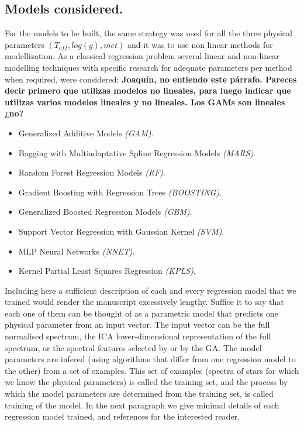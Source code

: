\subsection{Models considered.}
\label {ssub:models}
For the models to be built, the same strategy was used for all the
three physical parameters $(T_{eff}, log(g), met)$ and it was to use
non linear methods for modellization.  As a classical regression
problem several linear and non-linear modelling techniques with
specific research for adequate parameters per method when required,
were considered: {\bf Joaquín, no entiendo este párrafo. Pareces decir
primero que utilizas modelos no lineales, para luego indicar que
utilizas varios modelos lineales y no lineales. Los GAMs son lineales
¿no?}

\begin{itemize}
 \item {Generalized Additive Models \emph{(GAM)}.}
 \item {Bagging with Multiadaptative Spline Regression Models \emph{(MARS)}.}
 \item {Random Forest Regression Models \emph{(RF)}.} 
 \item {Gradient Boosting with Regression Trees \emph{(BOOSTING)}.}
 \item {Generalized Boosted Regression Models \emph{(GBM)}.}
 \item {Support Vector Regression with Gaussian Kernel \emph{(SVM)}.}
 \item {MLP Neural Networks \emph{(NNET)}.}
 \item {Kernel Partial Least Squares Regression \emph{(KPLS)}.}
 \end{itemize}


Including here a sufficient description of each and every regression
model that we trained would render the manuscript excessively
lengthy. Suffice it to say that each one of them can be thought of as
a parametric model that predicts one physical parameter from an input
vector. The input vector can be the full normalised spectrum, the ICA
lower-dimensional representation of the full spectrum, or the spectral
features selected by \cite{cesetti} or by the GA. The model parameters
are infered (using algorithms that differ from one regression model to
the other) from a set of examples. This set of examples (spectra of
stars for which we know the physical parameters) is called the
training set, and the process by which the model parameters are
determined from the training set, is called training of the model. In
the next paragraph we give minimal details of each regression model
trained, and references for the interested reader.

